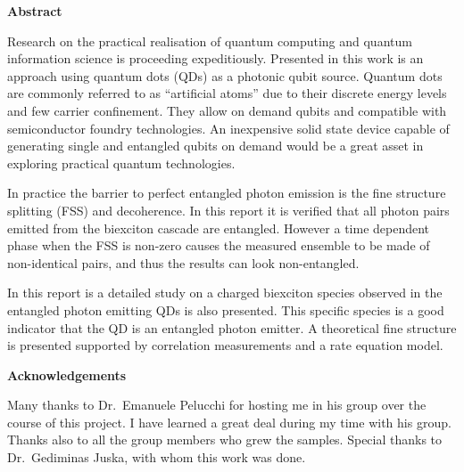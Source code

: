 \documentclass[12pt, twoside]{article}
\numberwithin{equation}{section}
\begin{document}
\restoregeometry
\newpage
\thispagestyle{empty} \mbox{}

\thispagestyle{empty} \mbox{}

\newpage
\thispagestyle{plain}

\begin{center}

    \normalsize
    
    \vspace{0.9cm}
    \textbf{Abstract}
\end{center}

Research on the practical realisation of quantum computing and quantum
information science is proceeding expeditiously. Presented in this work
is an approach using quantum dots (QDs) as a photonic qubit source.
Quantum dots are commonly referred to as ``artificial atoms'' due to
their discrete energy levels and few carrier confinement. They allow on
demand qubits and compatible with semiconductor foundry technologies. An
inexpensive solid state device capable of generating single and
entangled qubits on demand would be a great asset in exploring practical
quantum technologies.

In practice the barrier to perfect entangled photon emission is the fine
structure splitting (FSS) and decoherence. In this report it is verified
that all photon pairs emitted from the biexciton cascade are entangled.
However a time dependent phase when the FSS is non-zero causes the
measured ensemble to be made of non-identical pairs, and thus the
results can look non-entangled.

In this report is a detailed study on a charged biexciton species
observed in the entangled photon emitting QDs is also presented. This
specific species is a good indicator that the QD is an entangled photon
emitter. A theoretical fine structure is presented supported by
correlation measurements and a rate equation model.

\newpage
\thispagestyle{empty} \mbox{}

\newpage
\thispagestyle{plain}

\begin{center}

    \normalsize
    
    \vspace{0.9cm}
    \textbf{Acknowledgements}
\end{center}

Many thanks to Dr.~Emanuele Pelucchi for hosting me in his group over
the course of this project. I have learned a great deal during my time
with his group. Thanks also to all the group members who grew the
samples. Special thanks to Dr.~Gediminas Juska, with whom this work was
done.
\end{document}

